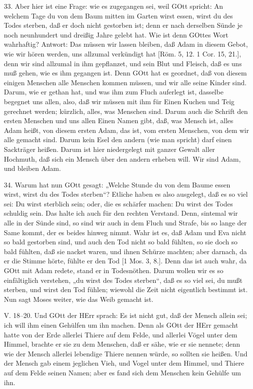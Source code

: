 33. Aber hier ist eine Frage: wie es zugegangen sei, weil GOtt spricht: An welchem Tage du von dem Baum mitten im Garten wirst essen, wirst du des Todes sterben, daß er doch nicht gestorben ist; denn er nach derselben Sünde je noch neunhundert und dreißig Jahre gelebt hat. Wie ist denn GOttes Wort wahrhaftig? Antwort: Das müssen wir lassen bleiben, daß Adam in diesem Gebot, wie wir hören werden, uns allzumal verkündigt hat [Röm. 5, 12. 1 Cor. 15, 21.], denn wir sind allzumal in ihm gepflanzet, und sein Blut und Fleisch, daß es uns muß gehen, wie es ihm gegangen ist. Denn GOtt hat es geordnet, daß von diesem einigen Menschen alle Menschen kommen müssen, und wir alle seine Kinder sind. Darum, wie er gethan hat, und was ihm zum Fluch auferlegt ist, dasselbe begegnet uns allen, also, daß wir müssen mit ihm für Einen Kuchen und Teig gerechnet werden; kürzlich, alles, was Menschen sind. Darum auch die Schrift den ersten Menschen und uns allen Einen Namen gibt, daß, was Mensch ist, alles Adam heißt, von diesem ersten Adam, das ist, vom ersten Menschen, von dem wir alle gemacht sind. Darum kein Esel den andern (wie man spricht) darf einen Sackträger heißen. Darum ist hier niedergelegt mit ganzer Gewalt aller Hochmuth, daß sich ein Mensch über den andern erheben will. Wir sind Adam, und bleiben Adam.

34. Warum hat nun GOtt gesagt: „Welche Stunde du von dem Baume essen wirst, wirst du des Todes sterben“? Etliche haben es also ausgelegt, daß es so viel sei: Du wirst sterblich sein; oder, die es schärfer machen: Du wirst des Todes schuldig sein. Das halte ich auch für den rechten Verstand. Denn, sintemal wir alle in der Sünde sind, so sind wir auch in dem Fluch und Strafe, bis so lange der Same kommt, der es beides hinweg nimmt. Wahr ist es, daß Adam und Eva nicht so bald gestorben sind, und auch den Tod nicht so bald fühlten, so sie doch so bald fühlten, daß sie nacket waren, und ihnen Schürze machten; aber darnach, da er die Stimme hörte, fühlte er den Tod [1 Mos. 3, 8.]. Denn das ist auch wahr, da GOtt mit Adam redete, stand er in Todesnöthen. Darum wollen wir es so einfältiglich verstehen, „du wirst des Todes sterben“, daß es so viel sei, du mußt sterben, und wirst den Tod fühlen; wiewohl die Zeit nicht eigentlich bestimmt ist. Nun sagt Moses weiter, wie das Weib gemacht ist.

\begin{schriftzitat}
V. 18–20. Und GOtt der HErr sprach: Es ist nicht gut, daß der Mensch allein sei; ich will ihm einen Gehülfen um ihn machen. Denn als GOtt der HErr gemacht hatte von der Erde allerlei Thiere auf dem Felde, und allerlei Vögel unter dem Himmel, brachte er sie zu dem Menschen, daß er sähe, wie er sie nennete; denn wie der Mensch allerlei lebendige Thiere nennen würde, so sollten sie heißen. Und der Mensch gab einem jeglichen Vieh, und Vogel unter dem Himmel, und Thiere auf dem Felde seinen Namen; aber es fand sich dem Menschen kein Gehülfe um ihn.
\end{schriftzitat}

